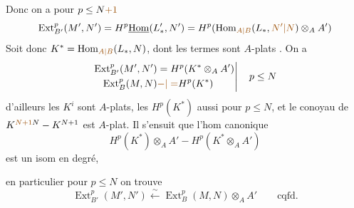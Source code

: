 Donc on a pour $p\le N\deleted{\unsure{+1}}$
\[
\operatorname{Ext}_{B'}^p(M',N')=H^p\underline{\operatorname{Hom}}(L'_*,N')=H^p(\operatorname{Hom}_{\unsure{A|B}}(L_*,\unsure{N'|N})\otimes_A A')
\]
Soit donc $K^*=\operatorname{Hom}_{\unsure{A|B}}(L_*,N)$, dont les termes sont $A$-plats .
On a
\[
\left.\begin{aligned}
\operatorname{Ext}_{B'}^p(M',N')&=H^p(K^*\otimes_A A')\\
\operatorname{Ext}_{B}^p(M,N)&\unsure{-|=}H^p(K^*)
\end{aligned}\right|\quad p\le N
\]
d'ailleurs les $K^i$ sont $A$-plats, les $H^p(K^*)$ aussi pour $p\le N$, et  le conoyau de $K^{\deleted{\unsure{N+1}}N}-K^{N+1}$ est $A$-plat. Il s'ensuit que l'hom canonique
\[
H^p(K^*)\otimes_A A' - H^p(K^*\otimes_A A')
\]
est un isom en  degré, 

en particulier pour $p\le N$ on trouve
\[
\operatorname{Ext}_{B'}^p(M',N')\xleftarrow{\sim}\operatorname{Ext}_{B}^p(M,N)\otimes_A A'
\qquad\text{cqfd.}
\]
